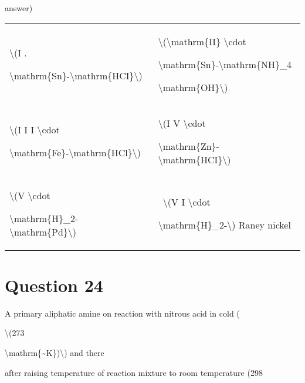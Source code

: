 \documentclass{article}
\begin{document}
answer)



\begin{longtable}[]{@{}ll@{}}

\toprule\noalign{}

\endhead

\bottomrule\noalign{}

\endlastfoot

\textbackslash(I .

\textbackslash mathrm\{Sn\}-\textbackslash mathrm\{HCI\}\textbackslash)~

& \textbackslash(\textbackslash mathrm\{II\} \textbackslash cdot

\textbackslash mathrm\{Sn\}-\textbackslash mathrm\{NH\}\_4

\textbackslash mathrm\{OH\}\textbackslash)~ \\

\textbackslash(I I I \textbackslash cdot

\textbackslash mathrm\{Fe\}-\textbackslash mathrm\{HCl\}\textbackslash)~

& \textbackslash(I V \textbackslash cdot

\textbackslash mathrm\{Zn\}-\textbackslash mathrm\{HCI\}\textbackslash)~ \\

\textbackslash(V \textbackslash cdot

\textbackslash mathrm\{H\}\_2-\textbackslash mathrm\{Pd\}\textbackslash)~

& ~\textbackslash(V I \textbackslash cdot

\textbackslash mathrm\{H\}\_2-\textbackslash) Raney nickel \\

\end{longtable}


\begin{enumerate}[label=(\alph*)]
\end{enumerate}
\newpage
\section*{Question 24}
A primary aliphatic amine on reaction with nitrous acid in cold (

\textbackslash(273

\textbackslash mathrm\{\textasciitilde K\})\textbackslash) and there

after raising temperature of reaction mixture to room temperature (298
\end{document}
